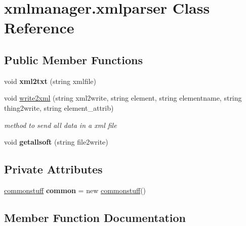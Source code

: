 \hypertarget{classxmlmanager_1_1xmlparser}{}\section{xmlmanager.\+xmlparser Class Reference}
\label{classxmlmanager_1_1xmlparser}
\subsection*{Public Member Functions}
\begin{DoxyCompactItemize}
\item 
\mbox{\label{classxmlmanager_1_1xmlparser_ad715a8e9ea783b12af4f23f93edb8c94}} 
void {\bfseries xml2txt} (string xmlfile)
\item 
void \hyperlink{classxmlmanager_1_1xmlparser_abf80c4a92297225b613f5cdfcc47557a}{write2xml} (string xml2write, string element, string elementname, string thing2write, string element\+\_\+attrib)
\begin{DoxyCompactList}\small\item\em method to send all data in a xml file \end{DoxyCompactList}\item 
\mbox{\label{classxmlmanager_1_1xmlparser_a5c8e2132a1e5a7a2932cb3b380c5cff0}} 
void {\bfseries getallsoft} (string file2write)
\end{DoxyCompactItemize}
\subsection*{Private Attributes}
\begin{DoxyCompactItemize}
\item 
\mbox{\label{classxmlmanager_1_1xmlparser_a8ef99a26e019421632d167fcb6c3f42e}} 
\hyperlink{classcommonmanager_1_1commonstuff}{commonstuff} {\bfseries common} = new \hyperlink{classcommonmanager_1_1commonstuff}{commonstuff}()
\end{DoxyCompactItemize}


\subsection{Member Function Documentation}
\mbox{\label{classxmlmanager_1_1xmlparser_abf80c4a92297225b613f5cdfcc47557a}} 
